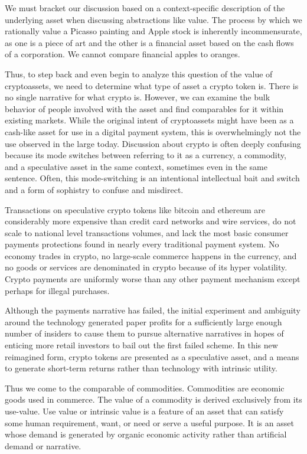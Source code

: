 We must bracket our discussion based on a context-specific description of the
underlying asset when discussing abstractions like value. The process by which
we rationally value a Picasso painting and Apple stock is inherently
incommensurate, as one is a piece of art and the other is a financial asset
based on the cash flows of a corporation. We cannot compare financial apples to
oranges.

Thus, to step back and even begin to analyze this question of the value of
cryptoassets, we need to determine what type of asset a crypto token is. There
is no single narrative for what crypto is. However, we can examine the bulk
behavior of people involved with the asset and find comparables for it within
existing markets. While the original intent of cryptoassets might have been as a
cash-like asset for use in a digital payment system, this is overwhelmingly not
the use observed in the large today. Discussion about crypto is often deeply
confusing because its mode switches between referring to it as a currency, a
commodity, and a speculative asset in the same context, sometimes even in the
same sentence. Often, this mode-switching is an intentional intellectual bait
and switch and a form of sophistry to confuse and misdirect.

Transactions on speculative crypto tokens like bitcoin and ethereum are
considerably more expensive than credit card networks and wire services, do not
scale to national level transactions volumes, and lack the most basic consumer
payments protections found in nearly every traditional payment system. No
economy trades in crypto, no large-scale commerce happens in the currency, and
no goods or services are denominated in crypto because of its hyper volatility.
Crypto payments are uniformly worse than any other payment mechanism except
perhaps for illegal purchases.

Although the payments narrative has failed, the initial experiment and ambiguity
around the technology generated paper profits for a sufficiently large enough
number of insiders to cause them to pursue alternative narratives in hopes of
enticing more retail investors to bail out the first failed scheme. In this new
reimagined form, crypto tokens are presented as a speculative asset, and a means
to generate short-term returns rather than technology with intrinsic utility.

Thus we come to the comparable of commodities. Commodities are economic goods
used in commerce. The value of a commodity is derived exclusively from its
use-value. Use value or intrinsic value is a feature of an asset that can
satisfy some human requirement, want, or need or serve a useful purpose. It is
an asset whose demand is generated by organic economic activity rather than
artificial demand or narrative.

